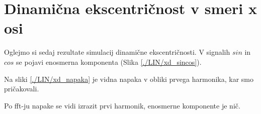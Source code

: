 %
%
%
\section{Dinamična ekscentričnost v smeri x osi}
%
Oglejmo si sedaj rezultate simulacij dinamične ekscentričnosti. V signalih $sin$ in $cos$ se pojavi enosmerna komponenta (Slika \ref{./LIN/xd_sincos}).

 Na sliki \ref{./LIN/xd_napaka} je vidna napaka v obliki prvega harmonika, kar smo pričakovali.

Po fft-ju napake se vidi izrazit prvi harmonik, enosmerne komponente je nič.


\newpage
